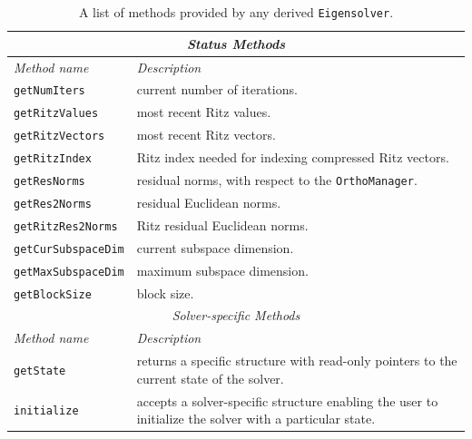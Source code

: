 \documentclass[acmtoms]{acmtrans2m}
\newcommand{\aspace}[1]{\texttt{#1}}
\begin{document}
\begin{table}[htp]
\begin{center}
\caption{A list of methods provided by any derived
\aspace{Eigensolver}.} \label{tab:anasazi:itermethods}
\begin{tabular}{| p{3cm} | p{6cm} |}
\hline
\multicolumn{2}{|c|}{\emph{Status Methods}} \\
\hline
\emph{Method name} & \emph{Description} \\
\hline
{\tt getNumIters}       & current number of iterations. \\
{\tt getRitzValues}     & most recent Ritz values. \\
{\tt getRitzVectors}    & most recent Ritz vectors. \\
{\tt getRitzIndex}      & Ritz index needed for indexing compressed Ritz vectors. \\
{\tt getResNorms}       & residual norms, with respect to the \aspace{OrthoManager}. \\
{\tt getRes2Norms}      & residual Euclidean norms. \\
{\tt getRitzRes2Norms}  & Ritz residual  Euclidean norms. \\
{\tt getCurSubspaceDim} & current subspace dimension. \\
{\tt getMaxSubspaceDim} & maximum subspace dimension. \\
{\tt getBlockSize}      & block size. \\
\hline
\multicolumn{2}{|c|}{\emph{Solver-specific Methods}} \\
\hline
\emph{Method name} & \emph{Description} \\
\hline
{\tt getState}       & returns a specific structure with read-only pointers to
                       the current state of the solver. \\
{\tt initialize}     & accepts a solver-specific structure enabling the user to initialize
                       the solver with a particular state.\\
\hline
\end{tabular}
\end{center}
\end{table}

\end{document}
